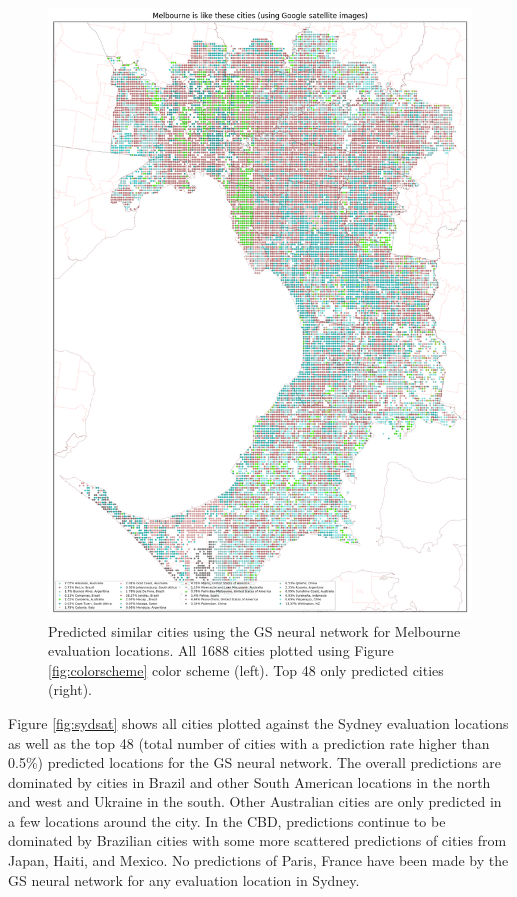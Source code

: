 \documentclass[sageh,times]{sagej}
\begin{document}
\begin{figure}[!htbp]
\includegraphics[scale=0.20]{Images/MelbourneOverallAbrev_sat.png} 
\caption{Predicted similar cities using the GS neural network for Melbourne evaluation locations. All 1688 cities plotted using Figure \ref{fig:colorscheme} color scheme (left). Top 48 only predicted cities (right).}    
 \label{fig:melsat}  
\end{figure} 



Figure \ref{fig:sydsat} shows all cities plotted against the Sydney evaluation locations as well as the top 48 (total number of cities with a prediction rate higher than 0.5\%) predicted locations for the GS neural network. The overall predictions are dominated by cities in Brazil and other South American locations in the north and west and Ukraine in the south. Other Australian cities are only predicted in a few locations around the city. In the CBD, predictions continue to be dominated by Brazilian cities with some more scattered predictions of cities from Japan, Haiti, and Mexico. No predictions of Paris, France have been made by the GS neural network for any evaluation location in Sydney.
\end{document}
